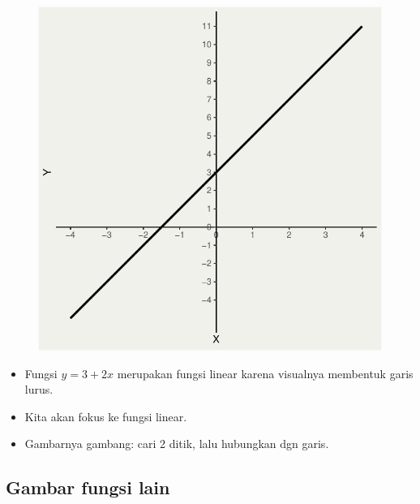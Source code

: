 \documentclass[
  letterpaper,
  DIV=11,
  numbers=noendperiod]{scrartcl}
\begin{document}
\begin{figure}[H]

{\centering \includegraphics{index_files/figure-pdf/unnamed-chunk-4-1.pdf}

}

\end{figure}

\begin{itemize}
\item
  Fungsi \(y=3+2x\) merupakan fungsi linear karena visualnya membentuk
  garis lurus.
\item
  Kita akan fokus ke fungsi linear.
\item
  Gambarnya gambang: cari 2 ditik, lalu hubungkan dgn garis.
\end{itemize}

\hypertarget{gambar-fungsi-lain}{%
\subsection{Gambar fungsi lain}\label{gambar-fungsi-lain}}
\end{document}
